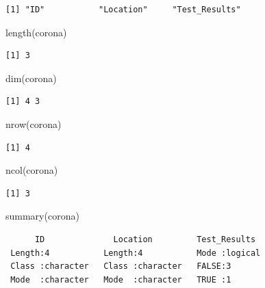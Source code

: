 \documentclass[
  letterpaper,
  DIV=11,
  numbers=noendperiod]{scrreprt}
\newenvironment{Shaded}{\begin{snugshade}}{\end{snugshade}}
\newcommand{\FunctionTok}[1]{\textcolor[rgb]{0.28,0.35,0.67}{#1}}
\newcommand{\NormalTok}[1]{\textcolor[rgb]{0.00,0.23,0.31}{#1}}
\begin{document}
\begin{verbatim}
[1] "ID"           "Location"     "Test_Results"
\end{verbatim}

\begin{Shaded}
\begin{Highlighting}[]
\FunctionTok{length}\NormalTok{(corona)}
\end{Highlighting}
\end{Shaded}

\begin{verbatim}
[1] 3
\end{verbatim}

\begin{Shaded}
\begin{Highlighting}[]
\FunctionTok{dim}\NormalTok{(corona)}
\end{Highlighting}
\end{Shaded}

\begin{verbatim}
[1] 4 3
\end{verbatim}

\begin{Shaded}
\begin{Highlighting}[]
\FunctionTok{nrow}\NormalTok{(corona)}
\end{Highlighting}
\end{Shaded}

\begin{verbatim}
[1] 4
\end{verbatim}

\begin{Shaded}
\begin{Highlighting}[]
\FunctionTok{ncol}\NormalTok{(corona)}
\end{Highlighting}
\end{Shaded}

\begin{verbatim}
[1] 3
\end{verbatim}

\begin{Shaded}
\begin{Highlighting}[]
\FunctionTok{summary}\NormalTok{(corona)}
\end{Highlighting}
\end{Shaded}

\begin{verbatim}
      ID              Location         Test_Results   
 Length:4           Length:4           Mode :logical  
 Class :character   Class :character   FALSE:3        
 Mode  :character   Mode  :character   TRUE :1        
\end{verbatim}
\end{document}
